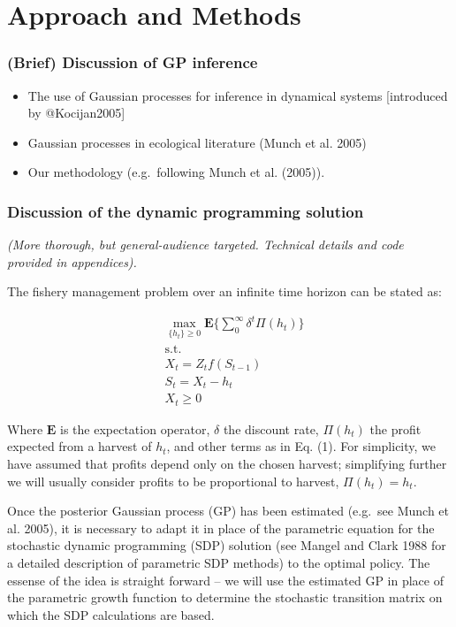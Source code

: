 \documentclass[author-year, review]{elsarticle} %
\begin{document}
\section{Approach and Methods}

\subsubsection{(Brief) Discussion of GP inference}

\begin{itemize}
\item
  The use of Gaussian processes for inference in dynamical systems
  {[}introduced by @Kocijan2005{]}
\item
  Gaussian processes in ecological literature (Munch et al. 2005)
\item
  Our methodology (e.g.~following Munch et al. (2005)).
\end{itemize}

\subsubsection{Discussion of the dynamic programming solution}

\emph{(More thorough, but general-audience targeted. Technical details
and code provided in appendices).}

The fishery management problem over an infinite time horizon can be
stated as:

\begin{align}
& \max_{ \{h_t\} \geq 0 } \mathbf{E} \lbrace \sum_0^\infty \delta^t \Pi(h_t) \rbrace \\
& \mathrm{s.t.}  \\
 & X_t = Z_t f\left(S_{t-1}\right) \\
 & S_t = X_t - h_t \\
 & X_t  \geq 0 
\end{align}

Where $\mathbf{E}$ is the expectation operator, $\delta$ the discount
rate, $\Pi(h_t)$ the profit expected from a harvest of $h_t$, and other
terms as in Eq. (1). For simplicity, we have assumed that profits depend
only on the chosen harvest; simplifying further we will usually consider
profits to be proportional to harvest, $\Pi(h_t) = h_t$.

Once the posterior Gaussian process (GP) has been estimated (e.g.~see
Munch et al. 2005), it is necessary to adapt it in place of the
parametric equation for the stochastic dynamic programming (SDP)
solution (see Mangel and Clark 1988 for a detailed description of
parametric SDP methods) to the optimal policy. The essense of the idea
is straight forward -- we will use the estimated GP in place of the
parametric growth function to determine the stochastic transition matrix
on which the SDP calculations are based.
\end{document}
